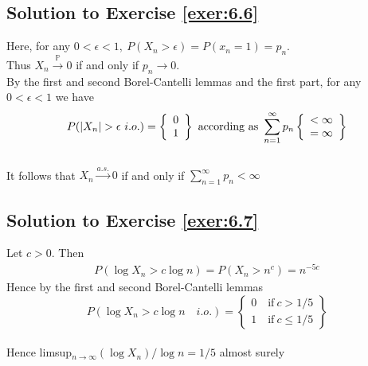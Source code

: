 \documentclass[12pt]{book}
\numberwithin{equation}{chapter}
\theoremstyle{plain}
\numberwithin{theorem}{section}
\theoremstyle{definition}
\numberwithin{exercise}{chapter}
\newcommand{\<}{\langle}
\renewcommand{\>}{\rangle}
\renewcommand{\(}{\left(}
\renewcommand{\)}{\right)}
\renewcommand{\[}{\left[}
\renewcommand{\]}{\right]}
\newcommand\Pb{\mathds{P}}
\begin{document}
\subsection*{Solution to Exercise \ref{exer:6.6}}
Here, for any $0 < \epsilon < 1, \ P(X_n > \epsilon) = P(x_n = 1)=p_n$.\\
Thus $X_n \stackrel{\Pb}{\rightarrow} 0$ if and only if $p_n \rightarrow 0$.\\
By the first and second Borel-Cantelli lemmas and the first part, for any $0 < \epsilon < 1$ we have\\
$$P(|X_n| > \epsilon \ i.o.) = 
   \left \{
    \begin{array}{c l}
       0\\
       1
     \end{array}
   \right \}
\text{ according as }
\sum_{n=1}^{\infty} p_n
\left \{
  \begin{array}{c l}
  < \infty\\
  = \infty
  \end{array}
\right \}
$$\\
It follows that $X_n \stackrel{a.s.}{\rightarrow}0$ if and only if $\sum_{n=1}^{\infty} p_n< \infty$

\subsection*{Solution to Exercise \ref{exer:6.7}}
Let $c > 0$. Then
\begin{align}
  P(\log X_n > c\log n) = P(X_n > n^c) = n^{-5c}
\end{align}
Hence by the first and second Borel-Cantelli lemmas\\
$$  P(\log X_n > c\log n \quad i.o.) =
\left \{
  \begin{array}{c }
  0 \quad \text{if} \ c > 1/5\\
  1 \quad \text{if} \ c\leq 1/5
  \end{array}
\right \}
$$\\
Hence limsup$_{n\rightarrow \infty} (\log X_n)/ \log n = 1/5 $ \quad almost surely

\end{document}
